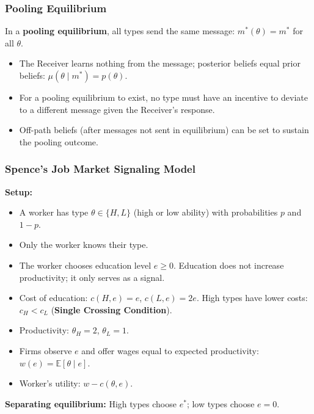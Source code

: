 \documentclass[hidelinks]{article}
\begin{document}
\subsubsection{Pooling Equilibrium}

In a \textbf{pooling equilibrium}, all types send the same message: $m^*(\theta) = m^*$ for all $\theta$.

\begin{itemize}
    \item The Receiver learns nothing from the message; posterior beliefs equal prior beliefs: $\mu(\theta \mid m^*) = p(\theta)$.
    \item For a pooling equilibrium to exist, no type must have an incentive to deviate to a different message given the Receiver's response.
    \item Off-path beliefs (after messages not sent in equilibrium) can be set to sustain the pooling outcome.
\end{itemize}

\subsubsection{Spence's Job Market Signaling Model}

\textbf{Setup:}
\begin{itemize}
    \item A worker has type $\theta \in \{H, L\}$ (high or low ability) with probabilities $p$ and $1-p$.
    \item Only the worker knows their type.
    \item The worker chooses education level $e \geq 0$. Education does not increase productivity; it only serves as a signal.
    \item Cost of education: $c(H, e) = e$, $c(L, e) = 2e$. High types have lower costs: $c_H < c_L$ (\textbf{Single Crossing Condition}).
    \item Productivity: $\theta_H = 2$, $\theta_L = 1$.
    \item Firms observe $e$ and offer wages equal to expected productivity: $w(e) = \mathbb{E}[\theta \mid e]$.
    \item Worker's utility: $w - c(\theta, e)$.
\end{itemize}

\textbf{Separating equilibrium:} High types choose $e^*$; low types choose $e = 0$.
\end{document}
